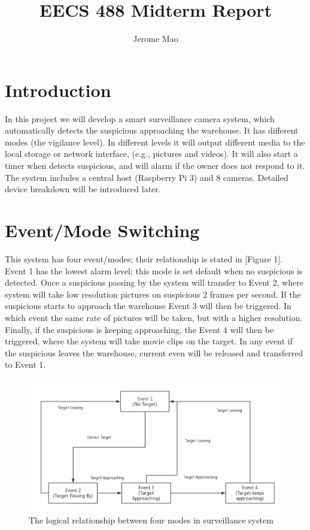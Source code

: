 \documentclass{article}
\begin{document}

\title{EECS 488 Midterm Report} %
\author{Jerome Mao} %
\maketitle

\setlength{\parindent}{1cm}
\onehalfspacing
\tableofcontents
\newpage

\section{Introduction}
\indent In this project we will develop a smart surveillance camera system, which automatically detects the suspicious approaching the warehouse. It has different modes (the vigilance level). In different levels it will output different media to the local storage or network interface, (e.g., pictures and videos). It will also start a timer when detects suspicious, and will alarm if the owner does not respond to it. The system includes a central host (Raspberry Pi 3) and 8 cameras. Detailed device breakdown will be introduced later.

\section{Event/Mode Switching}
\indent This system has four event/modes; their relationship is stated in [Figure 1]. Event 1 has the lowest alarm level; this mode is set default when no suspicious is detected. Once a suspicious passing by the system will transfer to Event 2, where system will take low resolution pictures on suspicious 2 frames per second. If the suspicious starts to approach the warehouse Event 3 will then be triggered. In which event the same rate of pictures will be taken, but with a higher resolution. Finally, if the suspicious is keeping approaching, the Event 4 will then be triggered, where the system will take movie clips on the target.\newline 
\indent In any event if the suspicious leaves the warehouse, current even will be released and transferred to Event 1.
\begin{figure}[h!]
\includegraphics[width=12cm]{EECS488_Flow_Chart.png}
\caption{The logical relationship between four modes in surveillance system}
\end{figure}
\end{document}
